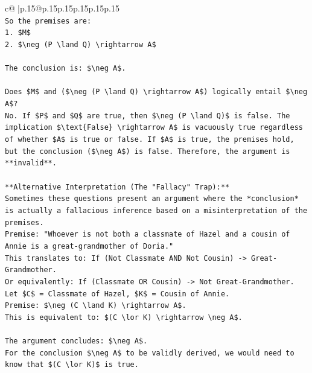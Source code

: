 \documentclass{article}
\begin{document}
{\begin{supertabular}{c@{$\;$}|p{.15\linewidth}@{}p{.15\linewidth}p{.15\linewidth}p{.15\linewidth}p{.15\linewidth}p{.15\linewidth}}
{{{\\ 
\texttt{So the premises are:} \\
\texttt{1.  \$M\$} \\
\texttt{2.  \$\textbackslash{}neg (P \textbackslash{}land Q) \textbackslash{}rightarrow A\$} \\
\\ 
\texttt{The conclusion is: \$\textbackslash{}neg A\$.} \\
\\ 
\texttt{Does \$M\$ and (\$\textbackslash{}neg (P \textbackslash{}land Q) \textbackslash{}rightarrow A\$) logically entail \$\textbackslash{}neg A\$?} \\
\texttt{No. If \$P\$ and \$Q\$ are true, then \$\textbackslash{}neg (P \textbackslash{}land Q)\$ is false. The implication \$\textbackslash{}text\{False\} \textbackslash{}rightarrow A\$ is vacuously true regardless of whether \$A\$ is true or false. If \$A\$ is true, the premises hold, but the conclusion (\$\textbackslash{}neg A\$) is false. Therefore, the argument is **invalid**.} \\
\\ 
\texttt{**Alternative Interpretation (The "Fallacy" Trap):**} \\
\texttt{Sometimes these questions present an argument where the *conclusion* is actually a fallacious inference based on a misinterpretation of the premises.} \\
\texttt{Premise: "Whoever is not both a classmate of Hazel and a cousin of Annie is a great{-}grandmother of Doria."} \\
\texttt{This translates to: If (Not Classmate AND Not Cousin) {-}> Great{-}Grandmother.} \\
\texttt{Or equivalently: If (Classmate OR Cousin) {-}> Not Great{-}Grandmother.} \\
\texttt{Let \$C\$ = Classmate of Hazel, \$K\$ = Cousin of Annie.} \\
\texttt{Premise: \$\textbackslash{}neg (C \textbackslash{}land K) \textbackslash{}rightarrow A\$.} \\
\texttt{This is equivalent to: \$(C \textbackslash{}lor K) \textbackslash{}rightarrow \textbackslash{}neg A\$.} \\
\\ 
\texttt{The argument concludes: \$\textbackslash{}neg A\$.} \\
\texttt{For the conclusion \$\textbackslash{}neg A\$ to be validly derived, we would need to know that \$(C \textbackslash{}lor K)\$ is true.} \\
}}}
\end{supertabular}}
\end{document}
